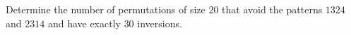 Determine the number of permutations of size $20$ that avoid the patterns $1324$ and $2314$ and have exactly $30$ inversions.
